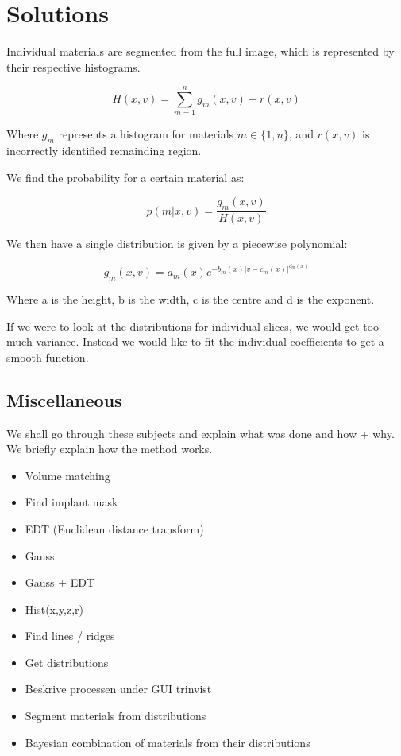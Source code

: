 \section*{Solutions}


Individual materials are segmented from the full image, which is represented by their respective histograms.

\begin{equation}
H(x,v) = \sum_{m=1}^{n} g_{m}(x,v) + r(x,v)
\end{equation}

Where $g_m$ represents a histogram for materials $m\in\{1,n\}$, and $r(x,v)$ is incorrectly identified remainding region.

We find the probability for a certain material as:

\begin{equation}
p(m|x,v) = \frac{g_{m}(x,v)}{H(x,v)}
\end{equation}

We then have a single distribution is given by a piecewise polynomial:

\begin{equation}
g_{m}(x,v) = a_{m}(x) e^{ -b_{m}(x) |v-c_{m}(x)|^{d_{m}(x)} }
\end{equation}

Where a is the height, b is the width, c is the centre and d is the exponent.

If we were to look at the distributions for individual slices, we would get too much variance.
Instead we would like to fit the individual coefficients to get a smooth function.

\subsection*{Miscellaneous}

We shall go through these subjects and explain what was done and how + why. We briefly explain how the method works.

\begin{itemize}
 \item Volume matching
 \item Find implant mask
 \item EDT (Euclidean distance transform)
 \item Gauss
 \item Gauss + EDT
 \item Hist(x,y,z,r)
 \item Find lines / ridges
 \item Get distributions
 \item Beskrive processen under GUI trinvist
 \item Segment materials from distributions
 \item Bayesian combination of materials from their distributions
\end{itemize}

